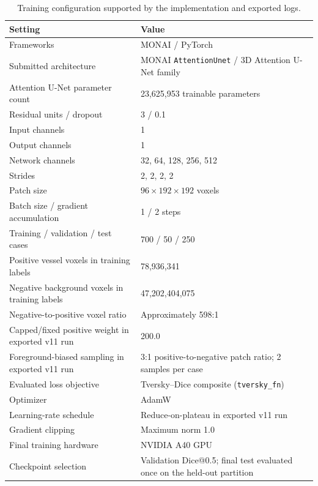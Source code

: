 \documentclass[anonymous]{iopjournal}
\begin{document}
\begin{table}[!t]
\centering
\caption{Training configuration supported by the implementation and exported logs.}
\label{tab:training}
\begin{threeparttable}
\footnotesize
\begin{tabularx}{0.92\textwidth}{L{0.42\textwidth}Y}
\toprule
\textbf{Setting} & \textbf{Value} \\
\midrule
Frameworks & MONAI / PyTorch \\
Submitted architecture & MONAI \texttt{AttentionUnet} / 3D Attention U-Net family \\
Attention U-Net parameter count & 23,625,953 trainable parameters \\
Residual units / dropout & 3 / 0.1 \\ %
Input channels & 1 \\
Output channels & 1 \\
Network channels & 32, 64, 128, 256, 512 \\
Strides & 2, 2, 2, 2 \\
Patch size & $96\times192\times192$ voxels \\
Batch size / gradient accumulation & 1 / 2 steps \\
Training / validation / test cases & 700 / 50 / 250 \\
Positive vessel voxels in training labels & 78,936,341 \\
Negative background voxels in training labels & 47,202,404,075 \\
Negative-to-positive voxel ratio & Approximately 598:1 \\
Capped/fixed positive weight in exported v11 run & 200.0 \\
Foreground-biased sampling in exported v11 run & 3:1 positive-to-negative patch ratio; 2 samples per case \\
Evaluated loss objective & Tversky--Dice composite (\texttt{tversky\_fn}) \\ %
Optimizer & AdamW \\
Learning-rate schedule & Reduce-on-plateau in exported v11 run \\
Gradient clipping & Maximum norm 1.0 \\
Final training hardware & NVIDIA A40 GPU \\
Checkpoint selection & Validation Dice@0.5; final test evaluated once on the held-out partition \\
\bottomrule
\end{tabularx}
\end{threeparttable}
\end{table}
\end{document}
